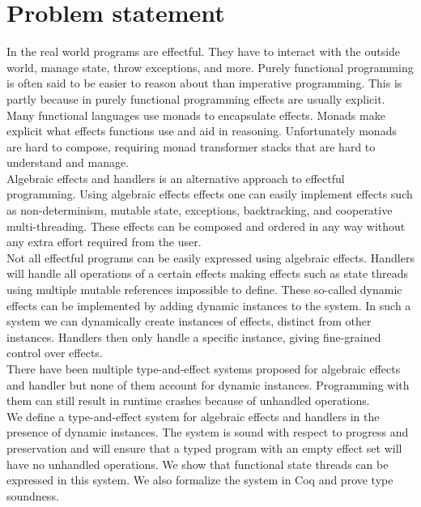 \documentclass[12pt]{article}
\begin{document}
\section{Problem statement}
In the real world programs are effectful. They have to interact with the outside world, manage state, throw exceptions, and more.
Purely functional programming is often said to be easier to reason about than imperative programming.
This is partly because in purely functional programming effects are usually explicit.
Many functional languages use monads to encapsulate effects.
Monads make explicit what effects functions use and aid in reasoning.
Unfortunately monads are hard to compose, requiring monad transformer stacks that are hard to understand and manage.
\\
Algebraic effects and handlers is an alternative approach to effectful programming.
Using algebraic effects effects one can easily implement effects such as non-determinism, mutable state, exceptions, backtracking, and cooperative multi-threading.
These effects can be composed and ordered in any way without any extra effort required from the user.
\\
Not all effectful programs can be easily expressed using algebraic effects.
Handlers will handle all operations of a certain effects making effects such as state threads using multiple mutable references impossible to define.
These so-called dynamic effects can be implemented by adding dynamic instances to the system.
In such a system we can dynamically create instances of effects, distinct from other instances.
Handlers then only handle a specific instance, giving fine-grained control over effects.
\\
There have been multiple type-and-effect systems proposed for algebraic effects and handler but none of them account for dynamic instances. Programming with them can still result in runtime crashes because of unhandled operations.
\\
We define a type-and-effect system for algebraic effects and handlers in the presence of dynamic instances.
The system is sound with respect to progress and preservation and will ensure that a typed program with an empty effect set will have no unhandled operations.
We show that functional state threads can be expressed in this system.
We also formalize the system in Coq and prove type soundness.
\end{document}

